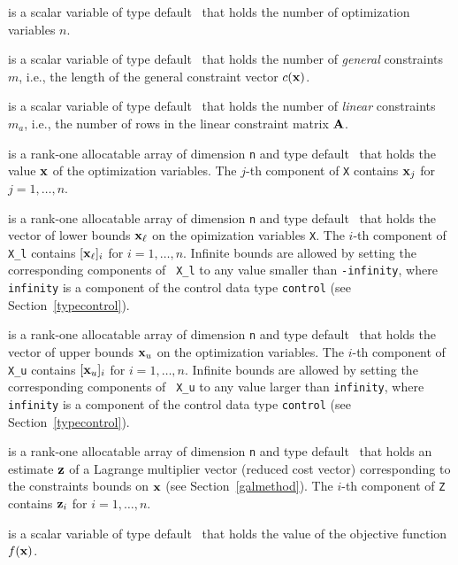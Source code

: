 \documentclass{galahad}
\begin{document}
\begin{description}

 is a scalar variable of type default \integer\
 that holds the number of optimization variables $n$.

 is a scalar variable of type default \integer\
 that holds the number of {\em general} constraints $m$, i.e., the length
 of the general constraint vector $c({\mathbf{x}})$.

 is a scalar variable of type default \integer\
 that holds the number of {\em linear} constraints $m_a$, i.e., the number
 of rows in the linear constraint matrix ${\mathbf{A}}$.

\ittf{X} is a rank-one allocatable array of dimension {\tt n} and type
default \realdp\ that holds the value ${\mathbf{x}}$ of the optimization variables.
The $j$-th component of {\tt X} contains
${\mathbf{x}}_{j}$ for $j = 1,  \ldots , n$.

\ittf{X\_l} is a rank-one allocatable array of dimension {\tt n}
and type default \realdp\ that holds the vector of lower bounds
${\mathbf{x}}_\ell$ on the opimization variables {\tt X}. The $i$-th component of
{\tt X\_l} contains $[{\mathbf{x}}_\ell]_i$ for $i = 1, \ldots , n$.  Infinite
bounds are allowed by setting the corresponding components of {\tt
  X\_l} to any value smaller than {\tt -infinity}, where {\tt
  infinity} is a component of the control data type {\tt control} (see
Section~\ref{typecontrol}).

\ittf{X\_u}  is a rank-one allocatable array of dimension {\tt n}
and type default \realdp\ that holds the vector of upper bounds
${\mathbf{x}}_u$ on the optimization variables.  The $i$-th component of
{\tt X\_u} contains $[{\mathbf{x}}_u]_i$ for $i = 1, \ldots , n$.  Infinite
bounds are allowed by setting the corresponding components of {\tt
  X\_u} to any value larger than {\tt infinity}, where {\tt
  infinity} is a component of the control data type {\tt control} (see
Section~\ref{typecontrol}).

\ittf{Z} is a rank-one allocatable array of dimension {\tt n} and type
default \realdp\ that holds an estimate ${\mathbf{z}}$ of a Lagrange
multiplier vector (reduced cost vector) corresponding to the
constraints bounds on ${\mathbf{x}}$ (see Section~\ref{galmethod}).
The $i$-th component of {\tt Z} contains ${\mathbf{z}}_{i}$ for $i = 1,
\ldots , n$.

\ittf{X\_status}

 is a scalar variable of type
default \realdp\ that holds the value of the objective function $f({\mathbf{x}})$.


\end{description}
\end{document}
